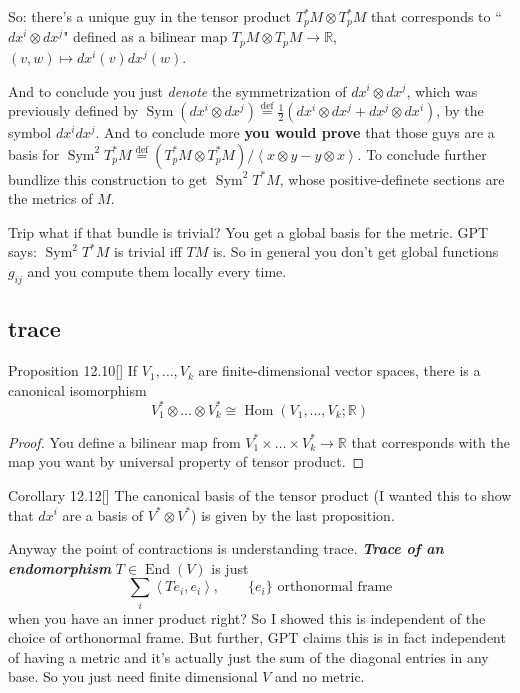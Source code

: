 So: there's a unique guy in the tensor product \(T_p ^*M \otimes T^*_pM\) that corresponds to ``\(dx^i \otimes dx^j\)" defined as a bilinear map \(T_pM \otimes T_pM\to \mathbb{R}\), \((v,w)\mapsto dx^i(v)dx^j(w)\).

And to conclude you just \textit{denote} the symmetrization of \(dx^i \otimes dx^j\), which was previously defined by \(\operatorname{Sym}(dx^i \otimes dx^j)\overset{\operatorname{def}}{=}\frac{1}{2}(dx^i \otimes dx^j +dx^j \otimes dx^i)\), by the symbol \(dx^idx^j\). And to conclude more \textbf{you would prove} that those guys are a basis for \(\operatorname{Sym}^2T_p^*M\overset{\operatorname{def}}{=}(T_p^* M \otimes T_p^*M)/\left<x \otimes y-y \otimes x\right>\). To conclude further bundlize this construction to get \(\operatorname{Sym}^2T^*M\), whose positive-definete sections are the metrics of \(M\).

\begin{thing8}{Trip}\leavevmode
what if that bundle is trivial? You get a global basis for the metric. GPT says: \(\operatorname{Sym}^2T^*M\) is trivial iff \(TM\) is. So in general you don't get global functions \(g_{ij}\) and you compute them locally every time.
\end{thing8}

\subsection{trace}

\begin{thing4}{Proposition 12.10}[\cite{les}]\label{prop:12.10}\leavevmode
If  \(V_1,\ldots,V_k\) are finite-dimensional vector spaces, there is a canonical isomorphism
\[V_1^*  \otimes\ldots \otimes V^*_k \cong \operatorname{Hom}(V_1,\ldots,V_k;\mathbb{R})\]
\end{thing4}
\begin{proof}\leavevmode
You define a bilinear map from \(V^*_1 \times \ldots \times V^*_k \to \mathbb{R}\) that corresponds with the map you want by universal property of tensor product.
\end{proof}

\begin{thing6}{Corollary 12.12}[\cite{les}]\leavevmode
The canonical basis of the tensor product (I wanted this to show that \(dx^i\) are a basis of \(V^* \otimes V^*\)) is given by the last proposition.
\end{thing6}

Anyway the point of contractions is understanding trace. \textit{\textbf{Trace of an endomorphism}} \(T \in \operatorname{End}(V)\) is just
\[\sum_i \left<Te_i,e_i\right>,\qquad \{e_i\}\text{ orthonormal frame} \]
when you have an inner product right? So I showed this is independent of the choice of orthonormal frame. But further, GPT claims this is in fact independent of having a metric and it's actually just the sum of the diagonal entries in any base. So you just need finite dimensional \(V\) and no metric.

